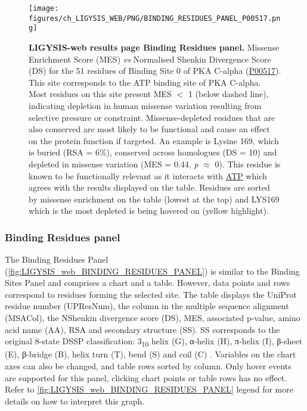 \begin{figure}[htb!]
    \centering
    \texttt{[image: figures/ch\_LIGYSIS\_WEB/PNG/BINDING\_RESIDUES\_PANEL\_P00517.png]}
    \caption[LIGYSIS-web results page Binding Residues panel]{\textbf{LIGYSIS-web results page Binding Residues panel.} Missense Enrichment Score (MES) \textit{vs} Normalised Shenkin Divergence Score (DS) for the 51 residues of Binding Site 0 of PKA C-alpha (\href{https://www.uniprot.org/uniprotkb/P00517/entry}{P00517}). This site corresponds to the ATP binding site of PKA C-alpha. Most residues on this site present MES $<$ 1 (below dashed line), indicating depletion in human missense variation resulting from selective pressure or constraint. Missense-depleted residues that are also conserved are most likely to be functional and cause an effect on the protein function if targeted. An example is Lysine 169, which is buried (RSA = 6\%), conserved across homologues (DS = 10) and depleted in missense variation (MES = 0.44, \textit{p} $\approx$ 0). This residue is known to be functionally relevant as it interacts with \href{https://www.ebi.ac.uk/pdbe-srv/pdbechem/chemicalCompound/show/ATP}{ATP} which agrees with the results displayed on the table. Residues are sorted by missense enrichment on the table (lowest at the top) and LYS169 which is the most depleted is being hovered on (yellow highlight).}
    \label{fig:LIGYSIS_web_BINDING_RESIDUES_PANEL}
\end{figure}

\subsubsection{Binding Residues panel}

The Binding Residues Panel (\autoref{fig:LIGYSIS_web_BINDING_RESIDUES_PANEL}) is similar to the Binding Sites Panel and comprises a chart and a table. However, data points and rows correspond to residues forming the selected site. The table displays the UniProt residue number (UPResNum), the column in the multiple sequence alignment (MSACol), the NShenkin divergence score (DS), MES, associated p-value, amino acid name (AA), RSA and secondary structure (SS). SS corresponds to the original 8-state DSSP classification: 3\textsubscript{10} helix (G), α-helix (H), π-helix (I), β-sheet (E), β-bridge (B), helix turn (T), bend (S) and coil (C) \cite{KABSCH_1983_DSSP}. Variables on the chart axes can also be changed, and table rows sorted by column. Only hover events are supported for this panel, clicking chart points or table rows has no effect. Refer to \autoref{fig:LIGYSIS_web_BINDING_RESIDUES_PANEL} legend for more details on how to interpret this graph.

